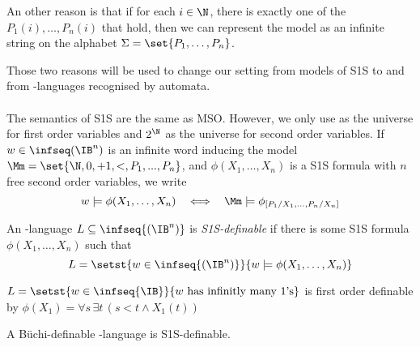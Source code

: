 An other reason is that
if for each $i \in \N$, there is exactly
one of the $P_1(i), \dots, P_n(i)$ that hold, then
we can represent the model as an infinite string
on the alphabet $\Sigma = \set{P_1, \dots, P_n}$.

Those two reasons will be used to change our setting from
models of S1S to and from \w-languages recognised by automata.

\paragraph{}
The semantics of S1S are the same as MSO. However,
we only use \N as the universe for first order variables
and $2^\N$ as the universe for second order variables.
If $w \in \infiniteWords$ is an infinite word inducing
the model $\Mm = \set{\N, 0, +1, <, P_1, ..., P_n}$,
and $\phi(X_1, \dots, X_n)$
is a S1S formula with $n$ free second order variables,
we write \[
    w \models \phi(X_1, \dots, X_n)
    ~~\iff~~
    \Mm \models \phi_{[P_1/X_1, \dots, P_n/X_n]}
\]

\begin{definition}
    An \w-language $L \subseteq \infseq{(\IB^n)}$ is
    \emph{S1S-definable} if there is some S1S formula
    $\phi(X_1, \dots, X_n)$ such that
\[
    L = \setst{w \in \infseq{(\IB^n)}}{
        w \models \phi(X_1, \dots, X_n)
    }
\]
\end{definition}

\begin{example}
    $L = \setst{w \in \infseq{\IB}}{w \text{ has infinitly many 1's}}$
    is first order definable by
    $\phi(X_1) = \forall s\, \exists t\, (s < t \wedge X_1(t))$
\end{example}



\begin{lemma}\label{lemma:buchi-definable}
    A Büchi-definable \w-language is S1S-definable.
\end{lemma}

